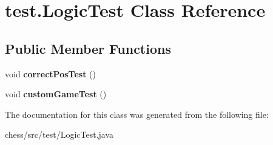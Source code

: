 \hypertarget{classtest_1_1_logic_test}{}\section{test.\+Logic\+Test Class Reference}
\label{classtest_1_1_logic_test}
\subsection*{Public Member Functions}
\begin{DoxyCompactItemize}
\item 
\mbox{\label{classtest_1_1_logic_test_a1b54423b5ceb6ebf7e28a07b4106174c}} 
void {\bfseries correct\+Pos\+Test} ()
\item 
\mbox{\label{classtest_1_1_logic_test_a769b3480f1fdeefacbe8c83816317d9e}} 
void {\bfseries custom\+Game\+Test} ()
\end{DoxyCompactItemize}


The documentation for this class was generated from the following file\+:\begin{DoxyCompactItemize}
\item 
chess/src/test/Logic\+Test.\+java\end{DoxyCompactItemize}
